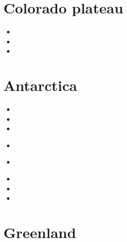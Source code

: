 \section{Colorado plateau}

\begin{scriptsize}
\begin{itemize}
\item[\nineteenseventynine]
\item[\twothousandten]
\item[\twothousandeleven]
\end{itemize}
\end{scriptsize}

\section{Antarctica}

\begin{scriptsize}
\begin{itemize}
\item[\nineteenninetyeight]
\item[\twothousandseven]
\item[\twothousandten]
\item[\twothousandtwelve]
 \\ 
\item[\twothousandthirteen]
 \\
\item[\twothousandfifteen]
\item[\twothousandeighteen]
\item[\twothousandtwentyone]
\end{itemize}
\end{scriptsize}

\section{Greenland}

